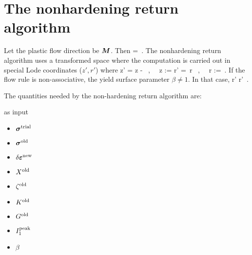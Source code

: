 \section{The nonhardening return algorithm}
Let the plastic flow direction be $\boldsymbol{M}$.  Then
\Beq
   = \dot{\lambda}\BM \,.
\Eeq
The nonhardening return algorithm uses a transformed space where the computation is carried out
in special Lode coordinates ($z', r'$) where
\Beq
  z' = z -  ~,~~ z :=  \quad \Tand \quad
  r' = \,r ~,~~ r :=  \,.
\Eeq
If the flow rule is non-associative, the yield surface parameter $\beta \ne 1$.  In that case,
\Beq
  r' \leftarrow \beta r' \,.
\Eeq

The quantities needed by the non-hardening return algorithm are:
\begin{algorithmic}[1]
  \Require as input
    \begin{itemize} 
      \item $\boldsymbol{\sigma}^{\text{trial}}$  
      \item $\boldsymbol{\sigma}^{\text{old}}$  
      \item $\delta\boldsymbol{\varepsilon}^{\text{new}}$  
      \item $X^{\text{old}}$       
      \item $\zeta^{\text{old}}$       
      \item $K^{\text{old}}$       
      \item $G^{\text{old}}$       
      \item $I_1^{\text{peak}}$ 
      \item $\beta$ 
    \end{itemize}
\end{algorithmic}

